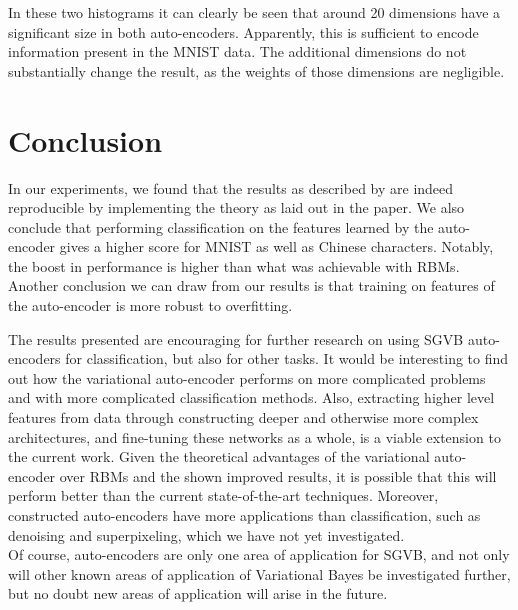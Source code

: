 \documentclass{article}
\begin{document}
In these two histograms it can clearly be seen that around 20 dimensions have a significant size in both auto-encoders. Apparently, this is sufficient to encode information present in the MNIST data. The additional dimensions do not substantially change the result, as the weights of those dimensions are negligible.

\pagebreak
\section*{Conclusion}

In our experiments, we found that the results as described by \cite{kingma2013auto} are indeed reproducible by implementing the theory as laid out in the paper. We also conclude that performing classification on the features learned by the auto-encoder gives a higher score for MNIST as well as Chinese characters. Notably, the boost in performance is higher than what was achievable with RBMs. Another conclusion we can draw from our results is that training on features of the auto-encoder is more robust to overfitting. 

The results presented are encouraging for further research on using SGVB auto-encoders for classification, but also for other tasks. It would be interesting to find out how the variational auto-encoder performs on more complicated problems and with more complicated classification methods. Also, extracting higher level features from data through constructing deeper and otherwise more complex architectures, and fine-tuning these networks as a whole, is a viable extension to the current work. Given the theoretical advantages of the variational auto-encoder over RBMs and the shown improved results, it is possible that this will perform better than the current state-of-the-art techniques. Moreover, constructed auto-encoders have more applications than classification, such as denoising and superpixeling, which we have not yet investigated. \\ 
Of course, auto-encoders are only one area of application for SGVB, and not only will other known areas of application of Variational Bayes be investigated further, but no doubt new areas of application will arise in the future.

\pagebreak 
\nocite{*}


\end{document}
